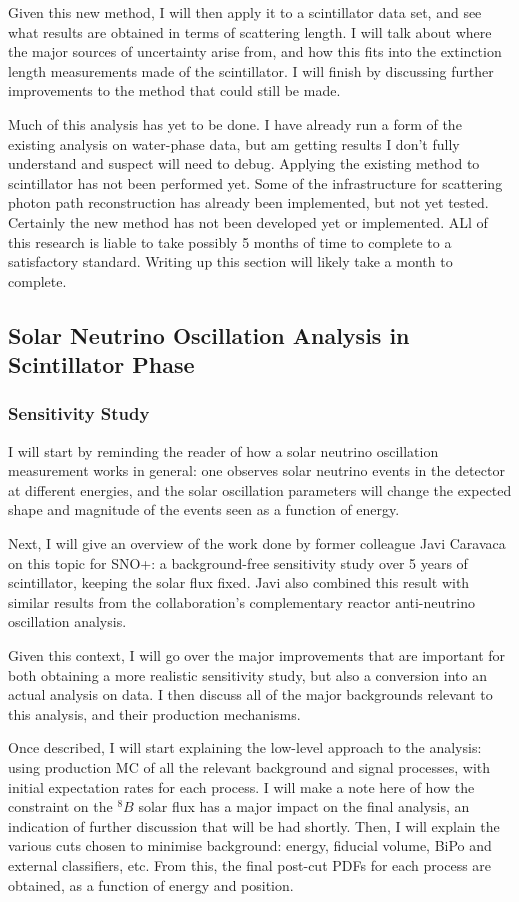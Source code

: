Given this new method, I will then apply it to a scintillator data set, and see what results are obtained in terms of scattering length. I will talk about where the major sources of uncertainty arise from, and how this fits into the extinction length measurements made of the scintillator. I will finish by discussing further improvements to the method that could still be made.

Much of this analysis has yet to be done. I have already run a form of the existing analysis on water-phase data, but am getting results I don't fully understand and suspect will need to debug. Applying the existing method to scintillator has not been performed yet. Some of the infrastructure for scattering photon path reconstruction has already been implemented, but not yet tested. Certainly the new method has not been developed yet or implemented. ALl of this research is liable to take possibly 5 months of time to complete to a satisfactory standard. Writing up this section will likely take a month to complete.

\subsection{Solar Neutrino Oscillation Analysis in Scintillator Phase}
\subsubsection{Sensitivity Study}
I will start by reminding the reader of how a solar neutrino oscillation measurement works in general: one observes solar neutrino events in the detector at different energies, and the solar oscillation parameters will change the expected shape and magnitude of the events seen as a function of energy.

Next, I will give an overview of the work done by former colleague Javi Caravaca on this topic for SNO+: a background-free sensitivity study over 5 years of scintillator, keeping the solar flux fixed. Javi also combined this result with similar results from the collaboration's complementary reactor anti-neutrino oscillation analysis.

Given this context, I will go over the major improvements that are important for both obtaining a more realistic sensitivity study, but also a conversion into an actual analysis on data. I then discuss all of the major backgrounds relevant to this analysis, and their production mechanisms.

Once described, I will start explaining the low-level approach to the analysis: using production MC of all the relevant background and signal processes, with initial expectation rates for each process. I will make a note here of how the constraint on the $^{8}B$ solar flux has a major impact on the final analysis, an indication of further discussion that will be had shortly. Then, I will explain the various cuts chosen to minimise background: energy, fiducial volume, BiPo and external classifiers, etc. From this, the final post-cut PDFs for each process are obtained, as a function of energy and position.

